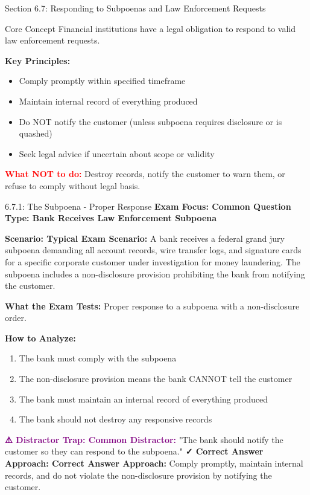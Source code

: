 \documentclass[11pt,a4paper]{beamer}
\newcommand{\redflag}[1]{\textcolor{red}{\textbf{#1}}}
\newcommand{\examfocus}[1]{\textcolor{orange!80!black}{\textbf{Exam Focus: #1}}}
\newcommand{\trap}[1]{\textcolor{purple}{\textbf{⚠️ Distractor Trap: #1}}}
\newcommand{\correct}[1]{\textcolor{green!50!black}{\textbf{✓ Correct Answer Approach: #1}}}
\newcommand{\scenario}[1]{\textcolor{blue!70!black}{\textbf{Scenario: #1}}}
\begin{document}
	
	\begin{frame}{Section 6.7: Responding to Subpoenas and Law Enforcement Requests}
		\begin{block}{Core Concept}
			Financial institutions have a legal obligation to respond to valid law enforcement requests.
		\end{block}
		\textbf{Key Principles:}
		\begin{itemize}
			\item Comply promptly within specified timeframe
			\item Maintain internal record of everything produced
			\item Do NOT notify the customer (unless subpoena requires disclosure or is quashed)
			\item Seek legal advice if uncertain about scope or validity
		\end{itemize}
		\redflag{What NOT to do:} Destroy records, notify the customer to warn them, or refuse to comply without legal basis.
	\end{frame}
	
	\begin{frame}{6.7.1: The Subpoena - Proper Response}
		\examfocus{Common Question Type: Bank Receives Law Enforcement Subpoena}
		
		\scenario{Typical Exam Scenario:}
		A bank receives a federal grand jury subpoena demanding all account records, wire transfer logs, and signature cards for a specific corporate customer under investigation for money laundering. The subpoena includes a non-disclosure provision prohibiting the bank from notifying the customer.
		
		\textbf{What the Exam Tests:} Proper response to a subpoena with a non-disclosure order.
		
		\textbf{How to Analyze:}
		\begin{enumerate}
			\item The bank must comply with the subpoena
			\item The non-disclosure provision means the bank CANNOT tell the customer
			\item The bank must maintain an internal record of everything produced
			\item The bank should not destroy any responsive records
		\end{enumerate}
		
		\trap{Common Distractor:} "The bank should notify the customer so they can respond to the subpoena."
		\correct{Correct Answer Approach:} Comply promptly, maintain internal records, and do not violate the non-disclosure provision by notifying the customer.
	\end{frame}
	
\end{document}
